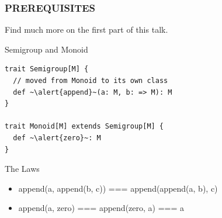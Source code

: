 \documentclass{beamer}
\begin{document}
\begin{frame}[fragile] \frametitle{PREREQUISITES}
Find much more on the first part of this talk.

  \begin{block}{Semigroup and Monoid}
  \begin{lstlisting}
trait Semigroup[M] {
  // moved from Monoid to its own class
  def ~\alert{append}~(a: M, b: => M): M
}

trait Monoid[M] extends Semigroup[M] {
  def ~\alert{zero}~: M
}
  \end{lstlisting}
  \vspace{-0.4cm}
  \end{block}

  \begin{block}{The Laws}
      \begin{itemize}
        \tt
        \item append(a, append(b, c)) === append(append(a, b), c)
        \item append(a, zero) === append(zero, a) === a
      \end{itemize}
  \end{block}
\end{frame}
\end{document}
